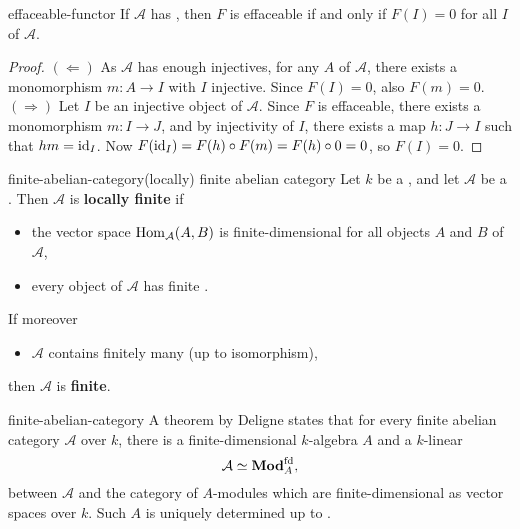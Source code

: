 \begin{example}{effaceable-functor}
    If $\mathcal{A}$ has , then $F$ is effaceable if and only if $F(I) = 0$ for all  $I$ of $\mathcal{A}$.
    \begin{proof}
        $(\Leftarrow)$ As $\mathcal{A}$ has enough injectives, for any $A$ of $\mathcal{A}$, there exists a monomorphism $m : A \to I$ with $I$ injective. Since $F(I) = 0$, also $F(m) = 0$.
        $(\Rightarrow)$ Let $I$ be an injective object of $\mathcal{A}$. Since $F$ is effaceable, there exists a monomorphism $m : I \to J$, and by injectivity of $I$, there exists a map $h : J \to I$ such that $hm = \textup{id}_I$. Now $F(\textup{id}_I) = F(h) \circ F(m) = F(h) \circ 0 = 0$, so $F(I) = 0$.
    \end{proof}
\end{example}

\begin{topic}{finite-abelian-category}{(locally) finite abelian category}
    Let $k$ be a , and let $\mathcal{A}$ be a . Then $\mathcal{A}$ is \textbf{locally finite} if
    \begin{itemize}
        \item the vector space $\operatorname{Hom}_\mathcal{A}(A, B)$ is finite-dimensional for all objects $A$ and $B$ of $\mathcal{A}$,
        \item every object of $\mathcal{A}$ has finite .
    \end{itemize}
    If moreover
    \begin{itemize}
        \item $\mathcal{A}$ contains finitely many  (up to isomorphism),
    \end{itemize}
    then $\mathcal{A}$ is \textbf{finite}.
\end{topic}

\begin{example}{finite-abelian-category}
    A theorem by Deligne states that for every finite abelian category $\mathcal{A}$ over $k$, there is a finite-dimensional $k$-algebra $A$ and a $k$-linear 
    \[ \mathcal{A} \simeq \textbf{Mod}_A^\textup{fd} , \]
    between $\mathcal{A}$ and the category of $A$-modules which are finite-dimensional as vector spaces over $k$. Such $A$ is uniquely determined up to .
\end{example}

